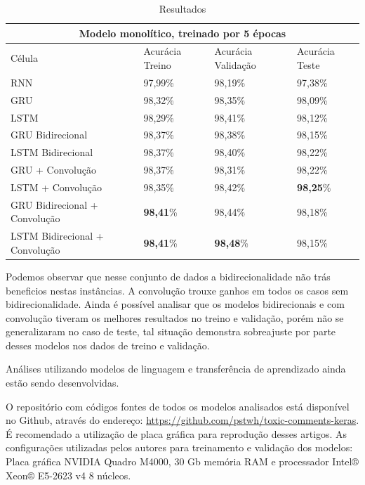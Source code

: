 \documentclass[12pt]{article}
\begin{document}
\begin{table}[!htb]
  \small
  \centering
  \renewcommand{\arraystretch}{1.15}
  \begin{tabular}{llll}
      \hline
      \multicolumn{4}{c}{Modelo monolítico, treinado por 5 épocas} \\
      \hline
    \hline
     Célula & Acurácia Treino & Acurácia Validação & Acurácia Teste \\
    RNN & 97,99\% & 98,19\% & 97,38\% \\
    GRU & 98,32\% & 98,35\% & 98,09\% \\
    LSTM & 98,29\% & 98,41\% & 98,12\% \\
    GRU Bidirecional & 98,37\% & 98,38\% & 98,15\% \\
    LSTM Bidirecional & 98,37\% & 98,40\% & 98,22\% \\
    GRU + Convolução & 98,37\% & 98,31\% & 98,22\% \\
    LSTM + Convolução & 98,35\% & 98,42\% & \textbf{98,25}\% \\
    GRU Bidirecional + Convolução & \textbf{98,41}\% & 98,44\% & 98,18\% \\
    LSTM Bidirecional + Convolução & \textbf{98,41}\% & \textbf{98,48}\% & 98,15\% \\
    \hline
  \end{tabular}
  \caption{Resultados}
  \label{tab:ptb}
\end{table}


Podemos observar que nesse conjunto de dados a bidirecionalidade não trás beneficios nestas instâncias. A convolução trouxe ganhos em todos os casos sem bidirecionalidade. Ainda é possível analisar que os modelos bidirecionais e com convolução tiveram os melhores resultados no treino e validação, porém não se generalizaram no caso de teste, tal situação demonstra sobreajuste por parte desses modelos nos dados de treino e validação.

Análises utilizando modelos de linguagem e transferência de aprendizado ainda estão sendo desenvolvidas.

O repositório com códigos fontes de todos os modelos analisados está disponível no Github, através do endereço: \url{https://github.com/pstwh/toxic-comments-keras}. É recomendado a utilização de placa gráfica para reprodução desses artigos. As configurações utilizadas pelos autores para treinamento e validação dos modelos: Placa gráfica NVIDIA Quadro M4000, 30 Gb memória RAM e processador Intel® Xeon® E5-2623 v4 8 núcleos.
\end{document}
